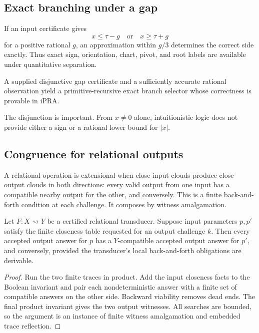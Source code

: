 \subsection{Exact branching under a gap}

If an input certificate gives
\[
 x\le \tau-g\quad\text{or}\quad x\ge \tau+g
\]
for a positive rational \(g\), an approximation within \(g/3\) determines the
correct side exactly.  Thus exact sign, orientation, chart, pivot, and root
labels are available under quantitative separation.

\begin{corollary}
\label{cor:exact-branch-gap}
A supplied disjunctive gap certificate and a sufficiently accurate rational
observation yield a primitive-recursive exact branch selector whose
correctness is provable in iPRA.
\end{corollary}

The disjunction is important.  From \(x\ne0\) alone, intuitionistic logic does
not provide either a sign or a rational lower bound for \(|x|\).

\subsection{Congruence for relational outputs}

A relational operation is extensional when close input clouds produce close
output clouds in both directions: every valid output from one input has a
compatible nearby output for the other, and conversely.  This is a finite
back-and-forth condition at each challenge.  It composes by witness
amalgamation.

\begin{theorem}
\label{thm:relational-congruence}
Let \(F:X\rightsquigarrow Y\) be a certified relational transducer.  Suppose
input parameters \(p,p'\) satisfy the finite closeness table requested for an
output challenge \(k\).  Then every accepted output answer for \(p\) has a
\(Y\)-compatible accepted output answer for \(p'\), and conversely, provided
the transducer's local back-and-forth obligations are derivable.
\end{theorem}

\begin{proof}
Run the two finite traces in product.  Add the input closeness facts to the
Boolean invariant and pair each nondeterministic answer with a finite set of
compatible answers on the other side.  Backward viability removes dead ends.
The final product invariant gives the two output witnesses.  All searches are
bounded, so the argument is an instance of finite witness amalgamation and
embedded trace reflection.
\end{proof}

